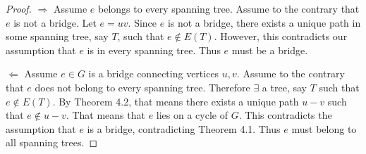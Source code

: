 \documentclass[10pt]{article}
\renewcommand{\qedsymbol}{}
\begin{document}
\begin{proof}\quad\newline
$\Rightarrow$ Assume $e$ belongs to every spanning tree. Assume to the contrary that $e$ is not a bridge. Let $e = uv$. Since $e$ is not a bridge, there exists a unique path in some spanning tree, say $T$, such that $e \notin E(T)$. However, this contradicts our assumption that $e$ is in every spanning tree. Thus $e$ must be a bridge.\newline 


$\Leftarrow$  
	Assume $e \in G$ is a bridge connecting vertices $u,v$. Assume to the contrary that $e$ does not belong to every spanning tree. Therefore $\exists$ a tree, say $T$ such that $e \notin E(T)$. By Theorem 4.2, that means there exists a unique path $u - v$ such that $e \notin u - v$. That means that $e$ lies on a cycle of $G$. This contradicts the assumption that $e$ is a bridge, contradicting Theorem 4.1. Thus $e$ must belong to all spanning trees.
    \renewcommand{\qedsymbol}{$\blacksquare$}
    
    \end{proof}
	
\end{document}
